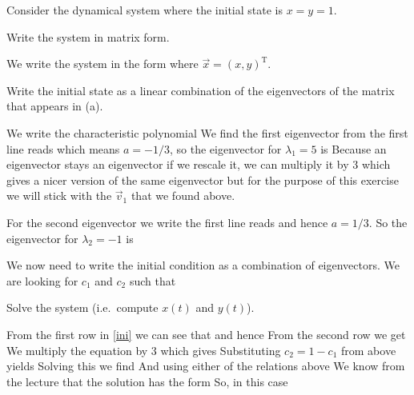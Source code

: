 Consider the dynamical system 
where the initial state is $x=y=1$.

\subquestion
Write the system in matrix form.

\solution
We write the system in the form 
where $\vec{x}=(x,y)^\mathrm{T}$.

\subquestion 
Write the initial state as a linear combination of the eigenvectors of the matrix that appears in (a). 

\solution
 We write the characteristic polynomial 
We find the first eigenvector from 
the first line reads 
which means $a=-1/3$, so the eigenvector for $\lambda_1=5$ is 
Because an eigenvector stays an eigenvector if we rescale it, we can multiply it by 3 which gives a nicer version of the same eigenvector
but for the purpose of this exercise we will stick with the $\vec{v}_1$ that we found above. 

For the second eigenvector we write 
the first line reads 
and hence $a=1/3$. So the eigenvector for $\lambda_2=-1$ is 

We now need to write the initial condition as a combination of eigenvectors. We are looking for $c_1$ and $c_2$ such that

\subquestion
Solve the system (i.e.~compute $x(t)$ and $y(t)$).

\solution
From the first row in \eqref{ini} we can see that 
and hence 
From the second row we get 
We multiply the equation by 3 which gives
Substituting $c_2=1-c_1$ from above yields
Solving this we find 
And using either of the relations above 
We know from the lecture that the solution has the form
So, in this case 


